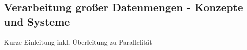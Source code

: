 
\subsection{Verarbeitung großer Datenmengen - Konzepte und Systeme}
\label{sec:GrosseDatenmengen}
Kurze Einleitung inkl. Überleitung zu Parallelität


